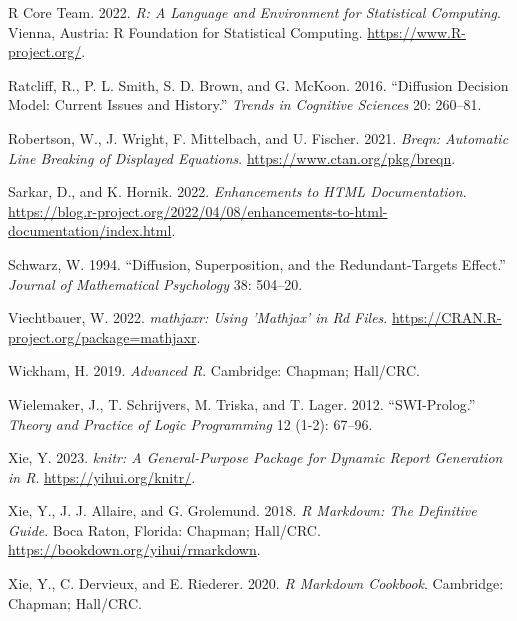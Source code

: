 \begin{CSLReferences}{1}{0}
\leavevmode{}%
R Core Team. 2022. \emph{R: A Language and Environment for Statistical Computing}. Vienna, Austria: R Foundation for Statistical Computing. \url{https://www.R-project.org/}.

\leavevmode{}%
Ratcliff, R., P. L. Smith, S. D. Brown, and G. McKoon. 2016. {``Diffusion Decision Model: Current Issues and History.''} \emph{Trends in Cognitive Sciences} 20: 260--81.

\leavevmode{}%
Robertson, W., J. Wright, F. Mittelbach, and U. Fischer. 2021. \emph{Breqn: Automatic Line Breaking of Displayed Equations}. \url{https://www.ctan.org/pkg/breqn}.

\leavevmode{}%
Sarkar, D., and K. Hornik. 2022. \emph{Enhancements to {HTML} {D}ocumentation}. \url{https://blog.r-project.org/2022/04/08/enhancements-to-html-documentation/index.html}.

\leavevmode{}%
Schwarz, W. 1994. {``Diffusion, Superposition, and the Redundant-Targets Effect.''} \emph{Journal of Mathematical Psychology} 38: 504--20.

\leavevmode{}%
Viechtbauer, W. 2022. \emph{{mathjaxr}: Using 'Mathjax' in Rd Files}. \url{https://CRAN.R-project.org/package=mathjaxr}.

\leavevmode{}%
Wickham, H. 2019. \emph{Advanced {R}}. Cambridge: Chapman; Hall/CRC.

\leavevmode{}%
Wielemaker, J., T. Schrijvers, M. Triska, and T. Lager. 2012. {``{SWI-Prolog}.''} \emph{Theory and Practice of Logic Programming} 12 (1-2): 67--96.

\leavevmode{}%
Xie, Y. 2023. \emph{{knitr}: A General-Purpose Package for Dynamic Report Generation in {R}}. \url{https://yihui.org/knitr/}.

\leavevmode{}%
Xie, Y., J. J. Allaire, and G. Grolemund. 2018. \emph{{R} Markdown: The Definitive Guide}. Boca Raton, Florida: Chapman; Hall/CRC. \url{https://bookdown.org/yihui/rmarkdown}.

\leavevmode{}%
Xie, Y., C. Dervieux, and E. Riederer. 2020. \emph{R Markdown Cookbook}. Cambridge: Chapman; Hall/CRC.

\end{CSLReferences}


